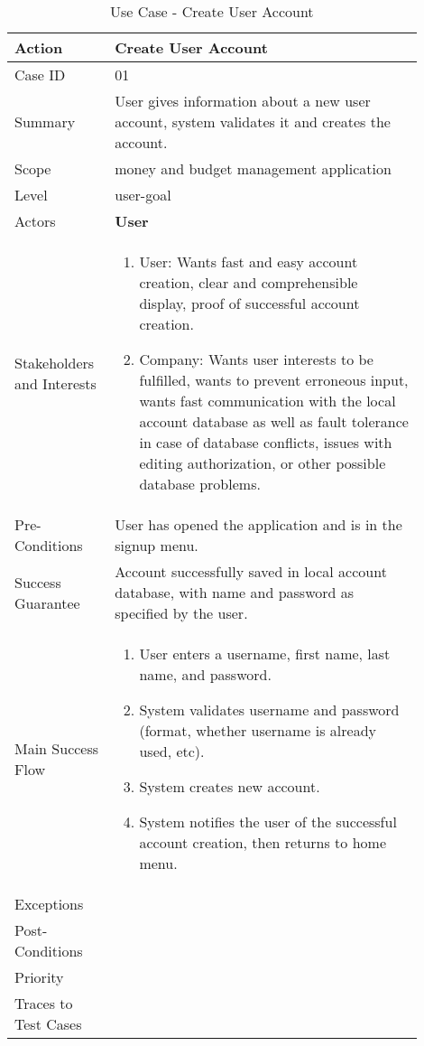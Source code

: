 \documentclass[11pt]{article}
\newcounter{use case ID}
\newcommand\tabularhead[1]{
\begin{table}[ht]
    \addtocounter{use case ID}{1}
    \caption{Use Case \arabic{use case ID} - #1}
    \vspace{0.2cm}
    \begin{tabular}{|p{0.2\linewidth}|p{0.70\linewidth}|}
    \hline
        \textbf{Action} & \textbf{#1} \\
        \hline}
\newcommand\addrow[2]{#1 & #2\\ \hline}
\newcommand\addmulrow[2]{ \begin{minipage}[t][][t]{2.5cm}#1\end{minipage}
        &\begin{minipage}[t][][t]{11cm}
        \begin{enumerate}[itemsep=-1ex] #2   \end{enumerate}
    \end{minipage}\vfill\\ \hline}
\newenvironment{usecase}{\tabularhead}
{\hline\end{tabular}\end{table}}
\begin{document}
\begin{usecase}{Create User Account}
    \addrow{Case ID}{01}
    \addrow{Summary}{User gives information about a new user account, system validates it and creates the account.}
    \addrow{Scope}{money and budget management application}
    \addrow{Level}{user-goal}
    \addrow{Actors}{\textbf{User}}
    \addmulrow{Stakeholders and Interests}{
        \item User: Wants fast and easy account creation, clear and comprehensible display, proof of successful account creation.
        \item Company: Wants user interests to be fulfilled, wants to prevent erroneous input, wants fast communication with the local account database as well as fault tolerance in case of database conflicts, issues with editing authorization, or other possible database problems.}
    \addrow{Pre-Conditions}{User has opened the application and is in the signup menu.}
    \addrow{Success Guarantee}{Account successfully saved in local account database, with name and password as specified by the user.}
    \addmulrow{Main Success Flow}{
        \item User enters a username, first name, last name, and password.
        \item System validates username and password (format, whether username is already used, etc).
        \item System creates new account.
        \item System notifies the user of the successful account creation, then returns to home menu.}
    \addrow{Exceptions}{}
    \addrow{Post-Conditions}{}
    \addrow{Priority}{}
    \addrow{Traces to Test Cases}{}
\end{usecase}
\end{document}
